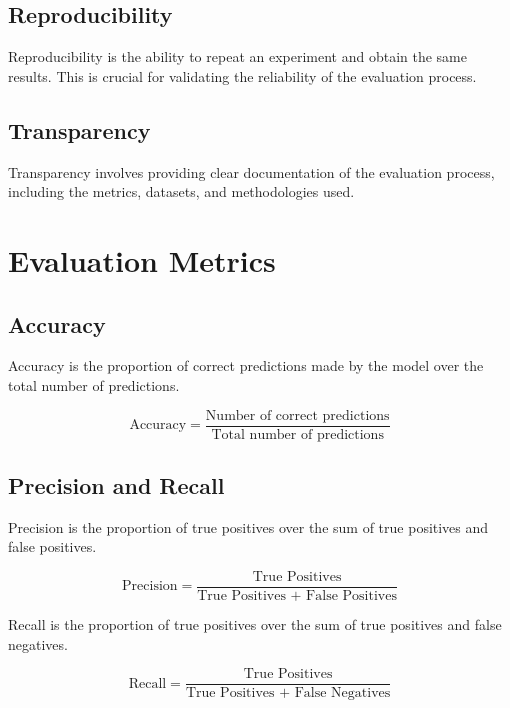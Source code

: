 \subsection{Reproducibility}
Reproducibility is the ability to repeat an experiment and obtain the same results. This is crucial for validating the reliability of the evaluation process.

\subsection{Transparency}
Transparency involves providing clear documentation of the evaluation process, including the metrics, datasets, and methodologies used.

\section{Evaluation Metrics}

\subsection{Accuracy}
Accuracy is the proportion of correct predictions made by the model over the total number of predictions.

\begin{equation}
\text{Accuracy} = \frac{\text{Number of correct predictions}}{\text{Total number of predictions}}
\end{equation}

\subsection{Precision and Recall}
Precision is the proportion of true positives over the sum of true positives and false positives.

\begin{equation}
\text{Precision} = \frac{\text{True Positives}}{\text{True Positives + False Positives}}
\end{equation}

Recall is the proportion of true positives over the sum of true positives and false negatives.

\begin{equation}
\text{Recall} = \frac{\text{True Positives}}{\text{True Positives + False Negatives}}
\end{equation}


